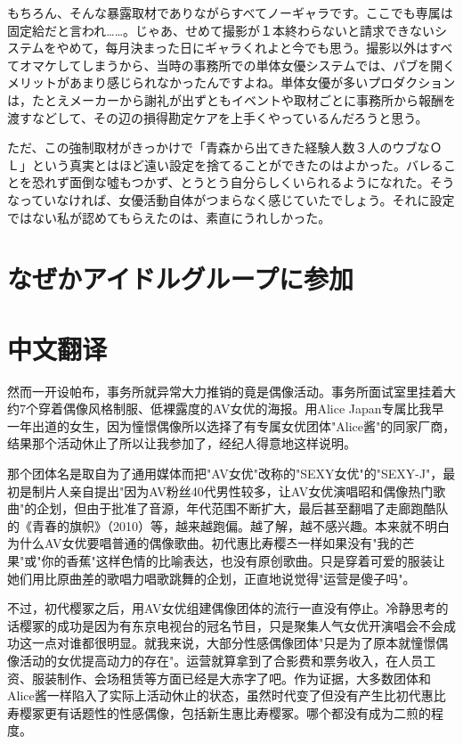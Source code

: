 \documentclass[12pt,UTF8]{ctexbook}
\begin{document}
もちろん、そんな暴露取材でありながらすべてノーギャラです。ここでも専属は固定給だと言われ……。じゃあ、せめて撮影が１本終わらないと請求できないシステムをやめて，每月決まった日にギャラくれよと今でも思う。撮影以外はすべてオマケしてしまうから、当時の事務所での単体女優システムでは、パブを開くメリットがあまり感じられなかったんですよね。単体女優が多いプロダクションは，たとえメーカーから謝礼が出ずともイベントや取材ごとに事務所から報酬を渡すなどして、その辺の損得勘定ケアを上手くやっているんだろうと思う。

ただ、この強制取材がきっかけで「青森から出てきた経験人数３人のウブなＯＬ」という真実とはほど遠い設定を捨てることができたのはよかった。バレることを恐れず面倒な噓もつかず、とうとう自分らしくいられるようになれた。そうなっていなければ、女優活動自体がつまらなく感じていたでしょう。それに設定ではない私が認めてもらえたのは、素直にうれしかった。

\switchcolumn

\section{なぜかアイドルグループに参加}

\switchcolumn

\section*{中文翻译}

然而一开设帕布，事务所就异常大力推销的竟是偶像活动。事务所面试室里挂着大约7个穿着偶像风格制服、低裸露度的AV女优的海报。用Alice Japan专属比我早一年出道的女生，因为憧憬偶像所以选择了有专属女优团体"Alice酱"的同家厂商，结果那个活动休止了所以让我参加了，经纪人得意地这样说明。

那个团体名是取自为了通用媒体而把"AV女优"改称的"SEXY女优"的"SEXY-J"，最初是制片人亲自提出"因为AV粉丝40代男性较多，让AV女优演唱昭和偶像热门歌曲"的企划，但由于批准了音源，年代范围不断扩大，最后甚至翻唱了走廊跑酷队的《青春的旗帜》（2010）等，越来越跑偏。越了解，越不感兴趣。本来就不明白为什么AV女优要唱普通的偶像歌曲。初代惠比寿樱츠一样如果没有"我的芒果"或"你的香蕉"这样色情的比喻表达，也没有原创歌曲。只是穿着可爱的服装让她们用比原曲差的歌唱力唱歌跳舞的企划，正直地说觉得"运营是傻子吗"。

不过，初代樱冢之后，用AV女优组建偶像团体的流行一直没有停止。冷静思考的话樱冢的成功是因为有东京电视台的冠名节目，只是聚集人气女优开演唱会不会成功这一点对谁都很明显。就我来说，大部分性感偶像团体"只是为了原本就憧憬偶像活动的女优提高动力的存在"。运营就算拿到了合影费和票务收入，在人员工资、服装制作、会场租赁等方面已经是大赤字了吧。作为证据，大多数团体和Alice酱一样陷入了实际上活动休止的状态，虽然时代变了但没有产生比初代惠比寿樱冢更有话题性的性感偶像，包括新生惠比寿樱冢。哪个都没有成为二煎的程度。
\end{document}
